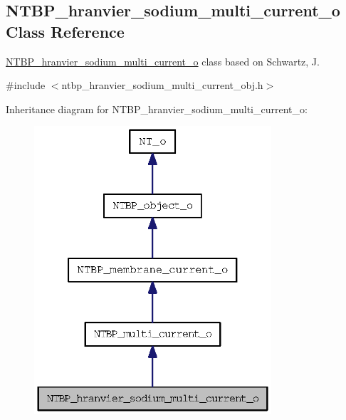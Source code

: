 \subsection{NTBP\_\-hranvier\_\-sodium\_\-multi\_\-current\_\-o Class Reference}
\label{class_n_t_b_p__hranvier__sodium__multi__current__o}


\hyperlink{class_n_t_b_p__hranvier__sodium__multi__current__o}{NTBP\_\-hranvier\_\-sodium\_\-multi\_\-current\_\-o} class based on Schwartz, J.  




{\ttfamily \#include $<$ntbp\_\-hranvier\_\-sodium\_\-multi\_\-current\_\-obj.h$>$}



Inheritance diagram for NTBP\_\-hranvier\_\-sodium\_\-multi\_\-current\_\-o:
\nopagebreak
\begin{figure}[H]
\begin{center}
\leavevmode
\includegraphics[width=250pt]{class_n_t_b_p__hranvier__sodium__multi__current__o__inherit__graph}
\end{center}
\end{figure}


